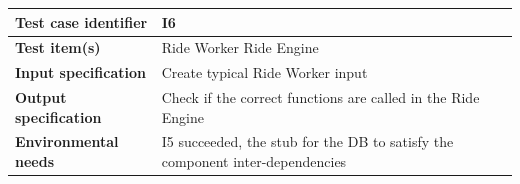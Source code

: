 \documentclass[a4paper,11pt]{report} %
\begin{document}
		\begin{center}
			\renewcommand{\arraystretch}{1.2}
			\setlength{\tabcolsep}{24pt}
			\begin{tabular}{ l  p{9cm}}\hline
				\textbf{Test case identifier} & I6\\\hline
				\textbf{Test item(s)} & Ride Worker \textrightarrow Ride Engine\\\hline
				\textbf{Input specification} & Create typical Ride Worker input \\\hline
				\textbf{Output specification} & Check if the correct functions are called in the Ride Engine\\\hline
				\textbf{Environmental needs} & I5 succeeded, the stub for the DB to satisfy the component inter-dependencies\\\hline
			\end{tabular}
		\end{center}				
		
\end{document}
